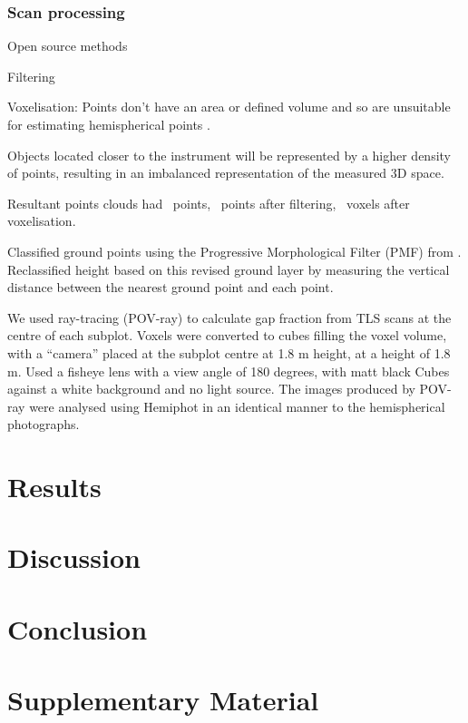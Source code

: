 \documentclass[11pt,a4paper]{article}
\newcommand{\beginsupplement}{%
	\setcounter{table}{0}
	\renewcommand{\thetable}{S\arabic{table}}%
	\setcounter{figure}{0}
	\renewcommand{\thefigure}{S\arabic{figure}}%
}
\begin{document}
\subsubsection{Scan processing}

Open source methods

Filtering

Voxelisation: Points don't have an area or defined volume and so are unsuitable
for estimating hemispherical points \citep{Seidel2012}.

Objects located closer to the instrument will be represented by a higher density
of points, resulting in an imbalanced representation of the measured 3D space.

Resultant points clouds had ~points, ~points after filtering, ~voxels after
voxelisation.

Classified ground points using the Progressive Morphological Filter (PMF) from
\citep{Zhang2003}. Reclassified height based on this revised ground layer by
measuring the vertical distance between the nearest ground point and each point.

We used ray-tracing (POV-ray) to calculate gap fraction from TLS scans at the
centre of each subplot. Voxels were converted to cubes filling the voxel volume,
with a ``camera'' placed at the subplot centre at 1.8 m height, at a height of
1.8 m. Used a fisheye lens with a view angle of 180 degrees, with matt black
Cubes against a white background and no light source. The images produced by
POV-ray were analysed using Hemiphot in an identical manner to the hemispherical
photographs.

\section{Results}

\section{Discussion}

\section{Conclusion}

\printbibliography

\section{Supplementary Material} \beginsupplement
\end{document}
